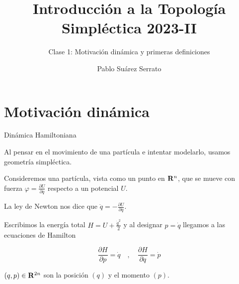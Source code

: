 \documentclass{beamer}
\title{Introducción a la Topología Simpléctica 2023-II}
\subtitle{Clase 1: Motivación dinámica y primeras definiciones} %
\author{Pablo Suárez Serrato}
\def\R\re
\def \R{{\bf R}}
\def \re{{\mathbb R}}
\begin{document}
\frenchspacing


  \frame{\maketitle}


    \section{Motivación dinámica}
%
    \begin{frame}{Dinámica Hamiltoniana}

Al pensar en el movimiento de una part\'icula e intentar modelarlo, usamos geometr\'ia simpl\'ectica. 
 \pause

Consideremos una part\'icula, vista como un punto en $\R^{n}$, que se mueve con fuerza $\varphi =\frac{\partial U}{\partial q}$ respecto a un potencial $U$. 
 \pause
 
La ley de Newton nos dice que $\ddot{q}=-\frac{\partial U}{\partial q}$. 
 \pause

Escribimos la energ\'ia total $H=U+\frac{\dot{q}^2}{2}$ y al designar $p=\dot{q}$ llegamos a las ecuaciones de Hamilton
 
$$\frac{\partial H}{\partial p} = \dot{q} \quad , \quad \frac{\partial H}{\partial q}  = \dot{p}$$

$ (q,p)\in \R^{2n}$ son la posici\'on $(q)$ y el momento $(p)$. 

\end{frame}
    
%    
    
\end{document}
